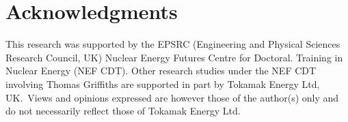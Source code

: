 \documentclass[journal]{IEEEtran}
\begin{document}
\section{Acknowledgments}
This research was supported by the EPSRC (Engineering and Physical Sciences Research Council, UK) Nuclear Energy Futures Centre for Doctoral. Training in Nuclear Energy (NEF CDT). Other research studies under the NEF CDT involving Thomas Griffiths are supported in part by Tokamak Energy Ltd, UK.\ Views and opinions expressed are however those of the author(s) only and do not necessarily reflect those of Tokamak Energy Ltd.





\begin{appendices}
    
 \end{appendices}
\end{document}
